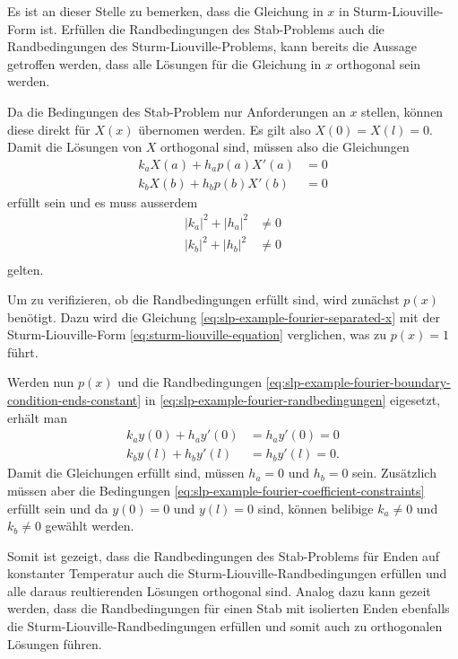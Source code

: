 Es ist an dieser Stelle zu bemerken, dass die Gleichung in $x$ in 
Sturm-Liouville-Form ist.
Erfüllen die Randbedingungen des Stab-Problems auch die Randbedingungen des
Sturm-Liouville-Problems, kann bereits die Aussage getroffen werden, dass alle
Lösungen für die Gleichung in $x$ orthogonal sein werden.

Da die Bedingungen des Stab-Problem nur Anforderungen an $x$ stellen, können
diese direkt für $X(x)$ übernomen werden. Es gilt also $X(0) = X(l) = 0$.
Damit die Lösungen von $X$ orthogonal sind, müssen also die Gleichungen
\begin{equation}
\begin{aligned}
	\label{eq:slp-example-fourier-randbedingungen}
	k_a X(a) + h_a p(a) X'(a) &= 0 \\
	k_b X(b) + h_b p(b) X'(b) &= 0
\end{aligned}
\end{equation}
erfüllt sein und es muss ausserdem
\begin{equation}
\begin{aligned}
    \label{eq:slp-example-fourier-coefficient-constraints}
    |k_a|^2 + |h_a|^2 &\neq 0\\
    |k_b|^2 + |h_b|^2 &\neq 0\\
\end{aligned}
\end{equation}
gelten.

Um zu verifizieren, ob die Randbedingungen erfüllt sind, wird zunächst
$p(x)$
benötigt.
Dazu wird die Gleichung \eqref{eq:slp-example-fourier-separated-x} mit der
Sturm-Liouville-Form \eqref{eq:sturm-liouville-equation} verglichen, was zu
$p(x) = 1$ führt.

Werden nun $p(x)$ und die Randbedingungen
\eqref{eq:slp-example-fourier-boundary-condition-ends-constant} in
\eqref{eq:slp-example-fourier-randbedingungen} eigesetzt, erhält man
\[
\begin{aligned}
	k_a y(0) + h_a y'(0) &= h_a y'(0) = 0 \\
	k_b y(l) + h_b y'(l) &= h_b y'(l) = 0.
\end{aligned}
\]
Damit die Gleichungen erfüllt sind, müssen $h_a = 0$ und $h_b = 0$ sein.
Zusätzlich müssen aber die Bedingungen 
\eqref{eq:slp-example-fourier-coefficient-constraints} erfüllt sein und
da $y(0) = 0$ und $y(l) = 0$ sind, können belibige $k_a \neq 0$ und $k_b \neq 0$
gewählt werden.

Somit ist gezeigt, dass die Randbedingungen des Stab-Problems für Enden auf
konstanter Temperatur auch die Sturm-Liouville-Randbedingungen erfüllen und
alle daraus reultierenden Lösungen orthogonal sind.
Analog dazu kann gezeit werden, dass die Randbedingungen für einen Stab mit
isolierten Enden ebenfalls die Sturm-Liouville-Randbedingungen erfüllen und
somit auch zu orthogonalen Lösungen führen.

